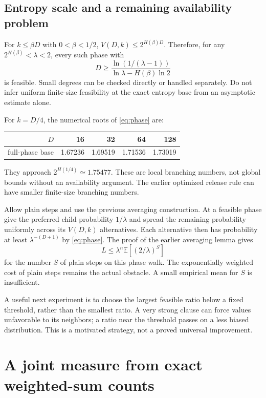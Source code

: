 \documentclass[11pt,a4paper]{article}
\theoremstyle{remark}
\newcommand{\E}{\mathbb E}
\begin{document}
\subsection{Entropy scale and a remaining availability problem}

For $k\le\beta D$ with $0<\beta<1/2$,
$V(D,k)\le2^{H(\beta)D}$. Therefore, for any
$2^{H(\beta)}<\lambda<2$, every such phase with
\begin{equation}
 D\ge \frac{\ln(1/(\lambda-1))}
                 {\ln\lambda-H(\beta)\ln2}                 \label{eq:threshold}
\end{equation}
is feasible. Small degrees can be checked directly or handled separately.
Do not infer uniform finite-size feasibility at the exact entropy base
from an asymptotic estimate alone.

For $k=D/4$, the numerical roots of \eqref{eq:phase} are:
\begin{center}
\begin{tabular}{rrrrr}
\toprule
$D$ & 16 & 32 & 64 & 128\\
\midrule
full-phase base & 1.67236 & 1.69519 & 1.71536 & 1.73019\\
\bottomrule
\end{tabular}
\end{center}
They approach $2^{H(1/4)}\simeq1.75477$. These are local branching numbers,
not global bounds without an availability argument. The earlier optimized
release rule can have smaller finite-size branching numbers.

Allow plain steps and use the previous averaging construction. At a feasible
phase give the preferred child probability $1/\lambda$ and spread the
remaining probability uniformly across its $V(D,k)$ alternatives. Each
alternative then has probability at least $\lambda^{-(D+1)}$ by
\eqref{eq:phase}. The proof of the earlier averaging lemma gives
\[
 L\le\lambda^n\E[(2/\lambda)^S]
\]
for the number $S$ of plain steps on this phase walk. The exponentially
weighted cost of plain steps remains the actual obstacle. A small empirical
mean for $S$ is insufficient.

A useful next experiment is to choose the largest feasible ratio below a
fixed threshold, rather than the smallest ratio. A very strong clause can
force values unfavorable to its neighbors; a ratio near the threshold
passes on a less biased distribution. This is a motivated strategy, not
a proved universal improvement.

\section{A joint measure from exact weighted-sum counts}
\end{document}
